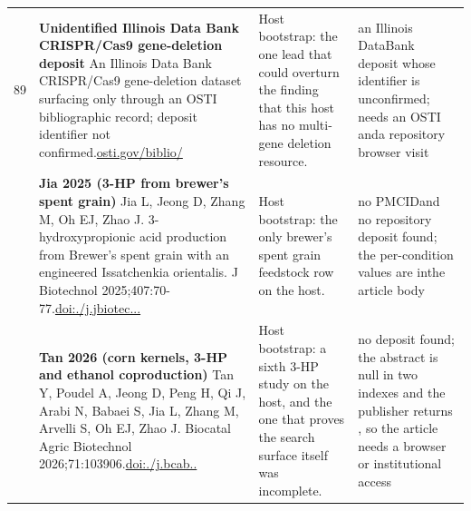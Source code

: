 \begin{landscape}
\begin{longtable}{@{}r@{\hspace{4pt}} L{78mm} L{72mm} L{76mm}@{}}
89 & \textbf{Unidentified Illinois Data Bank CRISPR/Cas9 gene-deletion deposit} \newline An Illinois Data Bank CRISPR/Cas9 gene-deletion dataset surfacing only through an OSTI bibliographic record; deposit identifier not confirmed.\newline \href{https://www.osti.gov/biblio/3013685}{osti.\allowbreak gov/\allowbreak biblio/} & Host bootstrap: the one lead that could overturn the finding that this host has no multi-gene deletion resource. & an Illin\allowbreak ois Data\allowbreak  Bank de\allowbreak posit wh\allowbreak ose iden\allowbreak tifier i\allowbreak s unconf\allowbreak irmed; n\allowbreak eeds an \allowbreak OSTI and\allowbreak  a repos\allowbreak itory br\allowbreak owser vi\allowbreak sit \\
 & \textbf{Jia 2025 (3-HP from brewer's spent grain)} \newline Jia L, Jeong D, Zhang M, Oh EJ, Zhao J. 3-hydroxypropionic acid production from Brewer's spent grain with an engineered Issatchenkia orientalis. J Biotechnol 2025;407:70-77.\newline \href{https://doi.org/10.1016/j.jbiotec.2025.08.009}{doi:./\allowbreak j.\allowbreak jbiotec\allowbreak ...} & Host bootstrap: the only brewer's spent grain feedstock row on the host. & no PMCID\allowbreak  and no \allowbreak reposito\allowbreak ry depos\allowbreak it found\allowbreak ; the pe\allowbreak r-\allowbreak conditi\allowbreak on value\allowbreak s are in\allowbreak  the art\allowbreak icle bod\allowbreak y \\
 & \textbf{Tan 2026 (corn kernels, 3-HP and ethanol coproduction)} \newline Tan Y, Poudel A, Jeong D, Peng H, Qi J, Arabi N, Babaei S, Jia L, Zhang M, Arvelli S, Oh EJ, Zhao J. Biocatal Agric Biotechnol 2026;71:103906.\newline \href{https://doi.org/10.1016/j.bcab.2025.103906}{doi:./\allowbreak j.\allowbreak bcab..} & Host bootstrap: a sixth 3-HP study on the host, and the one that proves the search surface itself was incomplete. & no depos\allowbreak it found\allowbreak ; the ab\allowbreak stract i\allowbreak s null i\allowbreak n two in\allowbreak dexes an\allowbreak d the pu\allowbreak blisher \allowbreak returns , so \allowbreak the arti\allowbreak cle need\allowbreak s a brow\allowbreak ser or i\allowbreak nstituti\allowbreak onal acc\allowbreak ess \\

\end{longtable}
\end{landscape}
